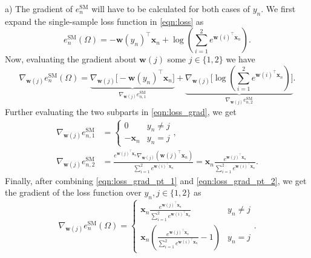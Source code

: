 \documentclass{article}
\renewcommand{\vec}[1]{\mathbf{#1}}
\begin{document}
    a) The gradient of $e_n^{\text{SM}}$ will have to be calculated for both
    cases of $y_n$. We first expand the single-sample loss function in 
    \eqref{eqn:loss} as
    \begin{equation}
        \label{eqn:loss_rewritten}
        e_n^{\text{SM}}(\Omega) = -\vec{w}(y_n)^\top\vec{x}_n+\log\left
        (\sum_{i=1}^2e^{\vec{w}(i)^\top\vec{x}_n}\right).
    \end{equation}
    Now, evaluating the gradient about $\vec{w}(j)$ some $j\in\{1,2\}$ we have
    \begin{equation}
        \label{eqn:loss_grad}
        \nabla_{\vec{w}(j)}e^{\text{SM}}_n(\Omega) = 
        \underbrace{\nabla_{\vec{w}(j)}\big[-\vec{w}(y_n)^\top\vec{x}_n\big]}_
        {\nabla_{\vec{w}(j)}e_{n,1}^{\text{SM}}}
        + \underbrace{\nabla_{\vec{w}(j)}\Bigg[\log\left
        (\sum_{i=1}^2e^{\vec{w}(i)^\top\vec{x}_n}\right)\Bigg]}_
        {\nabla_{\vec{w}(j)}e_{n,2}^{\text{SM}}}.
    \end{equation}
    Further evaluating the two subparts in \eqref{eqn:loss_grad}, we get
    \begin{align}
        \label{eqn:loss_grad_pt_1}
        \nabla_{\vec{w}(j)}e_{n,1}^{\text{SM}} &= 
        \begin{cases}
            0 & y_n \neq j\\
            -\vec{x}_n & y_n = j
        \end{cases},\\
        \label{eqn:loss_grad_pt_2}
        \nabla_{\vec{w}(j)}e_{n,2}^{\text{SM}} &= \frac{e^{\vec{w}(j)^\top\vec
        {x}_n}\nabla_{\vec{w}(j)}(\vec{w}(j)^\top\vec{x}_n)}{\sum_{i=1}^2e^
        {\vec{w}(i)^\top\vec{x}_n}} = \vec{x}_n\frac{e^{\vec{w}(j)^\top\vec{x}
        _n}}{\sum_{i=1}^2e^{\vec{w}(i)^\top\vec{x}_n}}.
    \end{align}
    Finally, after combining \eqref{eqn:loss_grad_pt_1} and 
    \eqref{eqn:loss_grad_pt_2}, we get the gradient of the loss 
    function over $y_n,j\in\{1,2\}$ as
    \begin{equation}
        \label{eqn:sm_loss_grad_combined}
        \nabla_{\vec{w}(j)}e^{\text{SM}}_n(\Omega) = 
        \begin{cases}
            \vec{x}_n\frac{e^{\vec{w}(j)^\top\vec{x}_n}}{\sum_{i=1}^2e^{\vec
            {w}(i)^\top\vec{x}_n}} & y_n \neq j\\ 
            \vec{x}_n\left(\frac{e^{\vec{w}(j)^\top\vec{x}_n}}{\sum_{i=1}^2e^
            {\vec{w}(i)^\top\vec{x}_n}}-1\right) & y_n = j
        \end{cases}.
    \end{equation}
\end{document}
